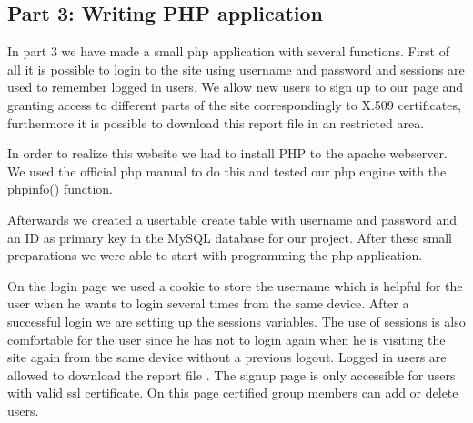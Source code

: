 \subsection {Part 3: Writing PHP application}


\noindent
In part 3 we have made a small php application with several functions. First of all it is possible to login to the site using username and password and sessions are used to remember logged in users. We allow new users to sign up to our page and granting access to different parts of the site correspondingly to X.509 certificates, furthermore it is possible to download this report file in an restricted area. \newline

\noindent
In order to realize this website we had to install PHP to the apache webserver. We used the official php manual to do this \cite{phpinstall}  and tested our php engine with the phpinfo() function.\newline

\noindent
Afterwards we created a usertable create table with username and password and an ID as primary key  in the MySQL database for our project. After these small preparations we were able to start with programming the php application.  \newline

\noindent
On the login page we used a cookie to store the username which is helpful for the user when he wants to login several times from the same device. After a successful login we are setting up the sessions variables. The use of sessions is also comfortable for the user since he has not to login again when he is visiting the site again from the same device without a previous logout. Logged in users  are allowed to download the report file . The signup page is only accessible for users with valid ssl certificate. On this page certified group members can add or delete users.
\newline
